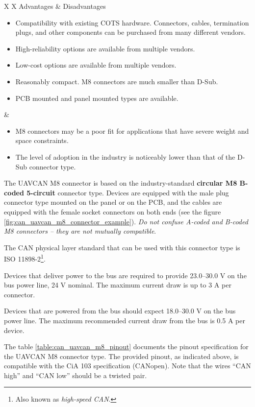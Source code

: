 {
\NoLeftSkip
\begin{UAVCANCompactTable}{X X}
    Advantages & Disadvantages \\
    \begin{itemize}
        \item Compatibility with existing COTS hardware.
        Connectors, cables, termination plugs, and other components can be purchased from many different vendors.
        \item High-reliability options are available from multiple vendors.
        \item Low-cost options are available from multiple vendors.
        \item Reasonably compact. M8 connectors are much smaller than D-Sub.
        \item PCB mounted and panel mounted types are available.
    \end{itemize}
    &
    \begin{itemize}
        \item M8 connectors may be a poor fit for applications that have severe weight and space constraints.
        \item The level of adoption in the industry is noticeably lower than that of the D-Sub connector type.
    \end{itemize}
\end{UAVCANCompactTable}
}

The UAVCAN M8 connector is based on the industry-standard \textbf{circular M8 B-coded 5-circuit} connector type.
Devices are equipped with the male plug connector type
mounted on the panel or on the PCB, and the cables are equipped with the female socket connectors on both ends
(see the figure \ref{fig:can_uavcan_m8_connector_example}).
\emph{Do not confuse A-coded and B-coded M8 connectors -- they are not mutually compatible}.

The CAN physical layer standard that can be used with this connector type is
ISO 11898-2\footnote{Also known as \emph{high-speed CAN}.}.

Devices that deliver power to the bus are required to provide 23.0--30.0 V on the bus power line, 24 V nominal.
The maximum current draw is up to 3 A per connector.

Devices that are powered from the bus should expect 18.0--30.0 V on the bus power line.
The maximum recommended current draw from the bus is 0.5 A per device.

The table \ref{table:can_uavcan_m8_pinout} documents the pinout specification for the UAVCAN M8 connector type.
The provided pinout, as indicated above, is compatible with the CiA 103 specification (CANopen).
Note that the wires ``CAN high'' and ``CAN low'' should be a twisted pair.

